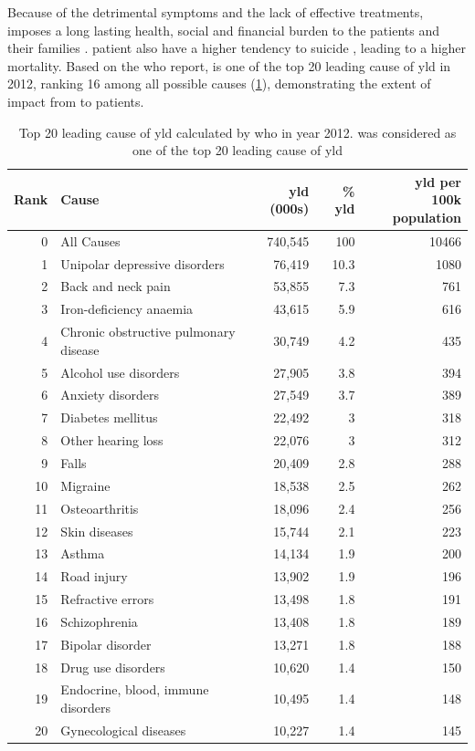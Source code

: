	Because of the detrimental symptoms and the lack of effective treatments,  imposes a long lasting health, social and financial burden to the patients and their families \citep{Knapp2004}. 
	 patient also have a higher tendency to suicide  \citep{Saha2007}, leading to a higher mortality.
	Based on the \gls{who} report,  is one of the top 20 leading cause of \gls{yld} in 2012, ranking 16 among all possible causes (\cref{tab:whoYLD}), demonstrating the extent of impact from  to patients.
	\begin{table}[ht]
		\centering
		\caption[Top 20 leading cause of ]{Top 20 leading cause of \gls{yld} calculated by \gls{who} in year 2012.
			 was considered as one of the top 20 leading cause of \gls{yld}\citep{Geneva2013}}
		\begin{tabular}{rp{5cm}rrr}
			\toprule
			Rank  & Cause & \gls{yld} (000s) & \% \gls{yld} & \specialcell[b]{\gls{yld} per \\100k population}\\
			\midrule
			0     & All Causes & 740,545 & 100   & 10466 \\
			1     & Unipolar depressive disorders & 76,419 & 10.3  & 1080 \\
			2     & Back and neck pain & 53,855 & 7.3   & 761 \\
			3     & Iron-deficiency anaemia & 43,615 & 5.9   & 616 \\
			4     & Chronic obstructive pulmonary disease & 30,749 & 4.2   & 435 \\
			5     & Alcohol use disorders & 27,905 & 3.8   & 394 \\
			6     & Anxiety disorders & 27,549 & 3.7   & 389 \\
			7     & Diabetes mellitus & 22,492 & 3     & 318 \\
			8     & Other hearing loss & 22,076 & 3     & 312 \\
			9     & Falls & 20,409 & 2.8   & 288 \\
			10    & Migraine & 18,538 & 2.5   & 262 \\
			11    & Osteoarthritis & 18,096 & 2.4   & 256 \\
			12    & Skin diseases & 15,744 & 2.1   & 223 \\
			13    & Asthma & 14,134 & 1.9   & 200 \\
			14    & Road injury & 13,902 & 1.9   & 196 \\
			15    & Refractive errors & 13,498 & 1.8   & 191 \\
			16    & Schizophrenia & 13,408 & 1.8   & 189 \\
			17    & Bipolar disorder & 13,271 & 1.8   & 188 \\
			18    & Drug use disorders & 10,620 & 1.4   & 150 \\
			19    & Endocrine, blood, immune disorders & 10,495 & 1.4   & 148 \\
			20    & Gynecological diseases & 10,227 & 1.4   & 145 \\
			\bottomrule
		\end{tabular}%
		\label{tab:whoYLD}%
	\end{table}%
